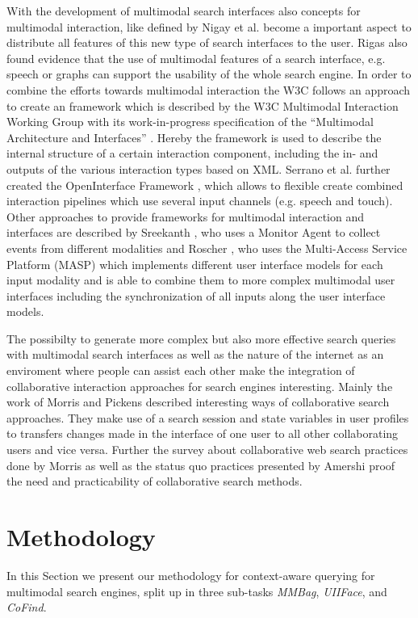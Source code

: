 \documentclass[runningheads,a4paper]{llncs} \usepackage[utf8]{inputenc}
\begin{document}
With the development of multimodal search interfaces also concepts for
multimodal interaction, like defined by Nigay et al. \cite{nigay} become a
important aspect to distribute all features of this new type of search
interfaces to the user. Rigas \cite{rigas2007} also found evidence that the use
of multimodal features of a search interface, e.g. speech or graphs can support
the usability of the whole search engine. 
In order to combine the efforts towards multimodal interaction the W3C follows
an approach to create an framework which is described by the W3C Multimodal
Interaction Working Group with its work-in-progress specification of the
``Multimodal Architecture and Interfaces'' \cite{w3cMMI}. Hereby the framework
is used to describe the internal structure of a certain interaction component,
including the in- and outputs of the various interaction types based on XML.
Serrano et al. further created the OpenInterface Framework \cite{openinterface},
which allows to flexible create combined interaction pipelines which use several
input channels (e.g. speech and touch). Other approaches to provide frameworks
for multimodal interaction and interfaces are described by Sreekanth
\cite{sreekanth}, who uses a Monitor Agent to collect events from different
modalities and Roscher \cite{roscher}, who uses the Multi-Access Service
Platform (MASP) which implements different user interface models for each input
modality and is able to combine them to more complex multimodal user interfaces
including the synchronization of all inputs along the user interface models.

The possibilty to generate more complex but also more effective search queries
with multimodal search interfaces as well as the nature of the internet as an
enviroment where people can assist each other make the integration of
collaborative interaction approaches for search engines interesting. Mainly the
work of Morris \cite{morris2007} and Pickens \cite{pickens2008} described
interesting ways of collaborative search approaches. They make use of a search
session and state variables in user profiles to transfers changes made in the
interface of one user to all other collaborating users and vice versa. Further
the survey about collaborative web search practices done by Morris
\cite{morris2008} as well as the status quo practices presented by Amershi
\cite{amershi2009} proof the need and practicability of collaborative search
methods.

\section{Methodology}
In this Section we present our methodology for context-aware querying for multimodal search engines, split up in three sub-tasks \emph{MMBag}, \emph{UIIFace}, and \emph{CoFind}.
\end{document}
